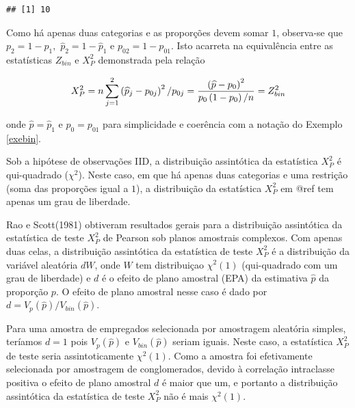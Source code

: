 \documentclass[]{book}
\numberwithin{example}{chapter}
\numberwithin{remark}{chapter}
\numberwithin{definition}{chapter}
\begin{document}
\begin{verbatim}
## [1] 10
\end{verbatim}

Como há apenas duas categorias e as proporções devem somar \(1\),
observa-se que \(p_{2}=1-p_{1},\) \(\widehat{p}_{2}=1-\widehat{p}_{1}\)
e \(p_{02}=1-p_{01}\). Isto acarreta na equivalência entre as
estatísticas \(Z_{bin}\) e \(X_{P}^{2}\) demonstrada pela relação

\begin{equation}
X_{P}^{2}=n\sum\limits_{j=1}^{2}\left( \widehat{p}%
_{j}-p_{0j}\right) ^{2}/p_{0j}=\frac{\left( \widehat{p}-p_{0}\right) ^{2}}{%
p_{0}\left( 1-p_{0}\right) /n}=Z_{bin}^{2}  
\label{eq:qual2}
\end{equation}

onde \(\widehat{p}=\widehat{p}_{1}\) e \(p_{0}=p_{01}\) para
simplicidade e coerência com a notação do Exemplo \ref{exebin}.

Sob a hipótese de observações IID, a distribuição assintótica da
estatística \(X_{P}^{2}\) é qui-quadrado (\(\chi^{2}\)). Neste caso, em
que há apenas duas categorias e uma restrição (soma das proporções igual
a \(1\)), a distribuição da estatística \(X_{P}^{2}\) em
@ref\label{eq:qual1} tem apenas um grau de liberdade.

Rao e Scott(1981) obtiveram resultados gerais para a distribuição
assintótica da estatística de teste \(X_{P}^{2}\) de Pearson sob planos
amostrais complexos. Com apenas duas celas, a distribuição assintótica
da estatística de teste \(X_{P}^{2}\) é a distribuição da variável
aleatória \(dW\), onde \(W\) tem distribuiçao
\(\chi ^{2}\left( 1\right)\) (qui-quadrado com um grau de liberdade) e
\(d\) é o efeito de plano amostral (EPA) da estimativa \(\widehat{p}\)
da proporção \(p\). O efeito de plano amostral nesse caso é dado por
\(d=V_{p}\left( \widehat{p}\right) /V_{bin}\left( \widehat{p}\right)\).

Para uma amostra de empregados selecionada por amostragem aleatória
simples, teríamos \(d=1\) pois \(V_{p}\left( \widehat{p}\right)\) e
\(V_{bin}\left( \widehat{p}\right)\) seriam iguais. Neste caso, a
estatística \(X_{P}^{2}\) de teste seria assintoticamente
\(\chi ^{2}\left(1\right)\). Como a amostra foi efetivamente selecionada
por amostragem de conglomerados, devido à correlação intraclasse
positiva o efeito de plano amostral \(d\) é maior que um, e portanto a
distribuição assintótica da estatística de teste \(X_{P}^{2}\) não é
mais \(\chi ^{2}\left( 1\right)\).
\end{document}
